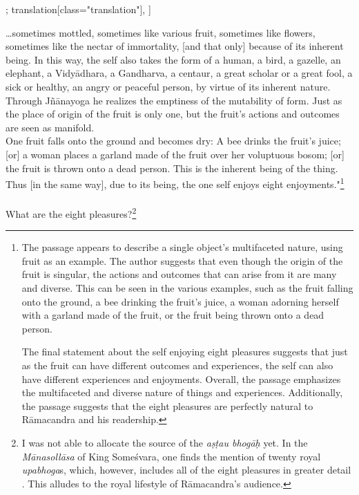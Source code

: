 \begin{alignment}[
  texts=edition[class="edition"];
  translation[class="translation"],
  ]
\begin{edition}
\begin{tlg}
{{  
  }\dd{}\begin{otherlanguage}{english}\end{otherlanguage}\hskip-2pt\dd{}}
\end{tlg}
  \end{edition}
  \begin{translation}
    \begin{tlate}
      \ldots sometimes mottled, sometimes like various fruit, sometimes like flowers, sometimes like the nectar of immortality, [and that only] because of its inherent being.\textsuperscript{\coro{[\lowroman{10}]}} In this way, the self also takes the form of a human, a bird, a gazelle, an elephant, a Vidyādhara, a Gandharva, a centaur, a great scholar or a great fool, a sick or healthy, an angry or peaceful person, by virtue of its inherent nature. Through Jñānayoga he realizes the emptiness of the mutability of form. Just as the place of origin of the fruit is only one, but the fruit's actions and outcomes are seen as manifold.\\

      One fruit falls onto the ground and becomes dry:\textsuperscript{\coro{[\lowroman{15}]}} A bee drinks the fruit's juice; [or] a woman places a garland made of the fruit over her voluptuous bosom; [or] the fruit is thrown onto a dead person. This is the inherent being of the thing. Thus [in the same way], due to its being, the one self enjoys eight enjoyments."\textsuperscript{\coro{[\lowroman{20}]}}\footnote{The passage appears to describe a single object's multifaceted nature, using fruit as an example. The author suggests that even though the origin of the fruit is singular, the actions and outcomes that can arise from it are many and diverse. This can be seen in the various examples, such as the fruit falling onto the ground, a bee drinking the fruit's juice, a woman adorning herself with a garland made of the fruit, or the fruit being thrown onto a dead person.

The final statement about the self enjoying eight pleasures suggests that just as the fruit can have different outcomes and experiences, the self can also have different experiences and enjoyments. Overall, the passage emphasizes the multifaceted and diverse nature of things and experiences. Additionally, the passage suggests that the eight pleasures are perfectly natural to Rāmacandra and his readership.}
\\ \\
What are the eight pleasures?\footnote{I was not able to allocate the source of the \textit{aṣṭau bhogāḥ} yet. In the \textit{Mānasollāsa} of King Someśvara, one finds the mention of twenty royal \textit{upabhoga}s, which, however, includes all of the eight pleasures in greater detail \parencite[5]{manasollasa}. This alludes to the royal lifestyle of Rāmacandra's audience.}  \hfill \break

\end{tlate}
\end{translation}
\end{alignment}
